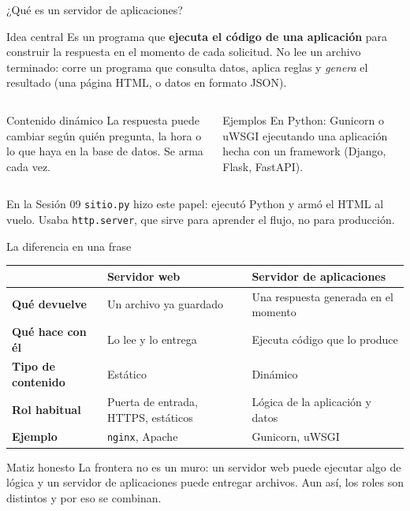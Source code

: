 \documentclass[aspectratio=169,10pt,c]{beamer}
\begin{document}
\begin{frame}{¿Qué es un servidor de aplicaciones?}
\begin{block}{Idea central}
\small Es un programa que \textbf{ejecuta el código de una aplicación} para construir la respuesta en el momento de cada solicitud. No lee un archivo terminado: corre un programa que consulta datos, aplica reglas y \emph{genera} el resultado (una página HTML, o datos en formato JSON).
\end{block}
\begin{columns}[T,onlytextwidth]
\begin{exampleblock}{Contenido dinámico}
\small La respuesta puede cambiar según quién pregunta, la hora o lo que haya en la base de datos. Se arma cada vez.
\end{exampleblock}
\begin{exampleblock}{Ejemplos}
\small En Python: Gunicorn o uWSGI ejecutando una aplicación hecha con un framework (Django, Flask, FastAPI).
\end{exampleblock}
\end{columns}
\begin{alertblock}{En la Sesión 09}
\small \texttt{sitio.py} hizo este papel: ejecutó Python y armó el HTML al vuelo. Usaba \texttt{http.server}, que sirve para aprender el flujo, no para producción.
\end{alertblock}
\end{frame}

\begin{frame}{La diferencia en una frase}
\begin{center}
\small
\begin{tabular}{>{\bfseries}p{3.4cm}p{4.6cm}p{4.6cm}}
\toprule
 & Servidor web & Servidor de aplicaciones \\
\midrule
Qué devuelve & Un archivo ya guardado & Una respuesta generada en el momento \\
Qué hace con él & Lo lee y lo entrega & Ejecuta código que lo produce \\
Tipo de contenido & Estático & Dinámico \\
Rol habitual & Puerta de entrada, HTTPS, estáticos & Lógica de la aplicación y datos \\
Ejemplo & \texttt{nginx}, Apache & Gunicorn, uWSGI \\
\bottomrule
\end{tabular}
\end{center}
\vspace{0.2cm}
\begin{block}{Matiz honesto}
\small La frontera no es un muro: un servidor web puede ejecutar algo de lógica y un servidor de aplicaciones puede entregar archivos. Aun así, los roles son distintos y por eso se combinan.
\end{block}
\end{frame}
\end{document}
